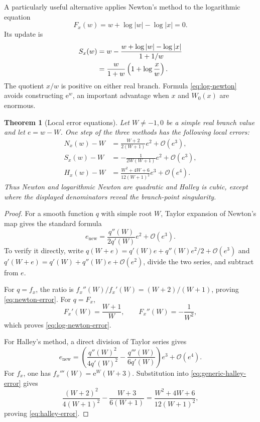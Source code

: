 \documentclass[11pt]{article}
\numberwithin{equation}{section}
\newtheorem{theorem}{Theorem}[section]
\theoremstyle{definition}
\theoremstyle{remark}
\newcommand{\e}{\mathrm e}
\begin{document}
A particularly useful alternative applies Newton's method to the logarithmic
equation
\begin{equation}
 F_x(w)=w+\log|w|-\log|x|=0.                           \label{eq:log-F}
\end{equation}
Its update is
\begin{align}
 S_x(w)
 &=w-\frac{w+\log|w|-\log|x|}{1+1/w}                 \notag\\
 &=\frac{w}{1+w}\left(1+\log\frac{x}{w}\right).      \label{eq:log-newton}
\end{align}
The quotient $x/w$ is positive on either real branch.  Formula
\eqref{eq:log-newton} avoids constructing $\e^w$, an important advantage when
$x$ and $W_0(x)$ are enormous.

\begin{theorem}[Local error equations]
\label{thm:local-errors}
Let $W\ne-1,0$ be a simple real branch value and let $e=w-W$.  One step of the
three methods has the following local errors:
\begin{align}
 N_x(w)-W
   &=\frac{W+2}{2(W+1)}e^2+\mathcal O(e^3),            \label{eq:newton-error}\\
 S_x(w)-W
   &=-\frac{1}{2W(W+1)}e^2+\mathcal O(e^3),            \label{eq:log-newton-error}\\
 H_x(w)-W
   &=\frac{W^2+4W+6}{12(W+1)^2}e^3+\mathcal O(e^4).   \label{eq:halley-error}
\end{align}
Thus Newton and logarithmic Newton are quadratic and Halley is cubic, except
where the displayed denominators reveal the branch-point singularity.
\end{theorem}

\begin{proof}
For a smooth function $q$ with simple root $W$, Taylor expansion of Newton's
map gives the standard formula
\begin{equation}
 e_{\mathrm{new}}=\frac{q''(W)}{2q'(W)}e^2
                   +\mathcal O(e^3).                  \label{eq:generic-newton-error}
\end{equation}
To verify it directly, write
$q(W+e)=q'(W)e+q''(W)e^2/2+\mathcal O(e^3)$ and
$q'(W+e)=q'(W)+q''(W)e+\mathcal O(e^2)$, divide the two series, and subtract
from $e$.

For $q=f_x$, the ratio is
$f_x''(W)/f_x'(W)=(W+2)/(W+1)$, proving
\eqref{eq:newton-error}.  For $q=F_x$,
\[
 F_x'(W)=\frac{W+1}{W},
 \qquad
 F_x''(W)=-\frac1{W^2},
\]
which proves \eqref{eq:log-newton-error}.

For Halley's method, a direct division of Taylor series gives
\begin{equation}
 e_{\mathrm{new}}=
 \left(\frac{q''(W)^2}{4q'(W)^2}
       -\frac{q'''(W)}{6q'(W)}\right)e^3
 +\mathcal O(e^4).                                    \label{eq:generic-halley-error}
\end{equation}
For $f_x$, one has
$f_x'''(W)=\e^W(W+3)$.  Substitution into
\eqref{eq:generic-halley-error} gives
\[
 \frac{(W+2)^2}{4(W+1)^2}-\frac{W+3}{6(W+1)}
 =\frac{W^2+4W+6}{12(W+1)^2},
\]
proving \eqref{eq:halley-error}.
\end{proof}
\end{document}
